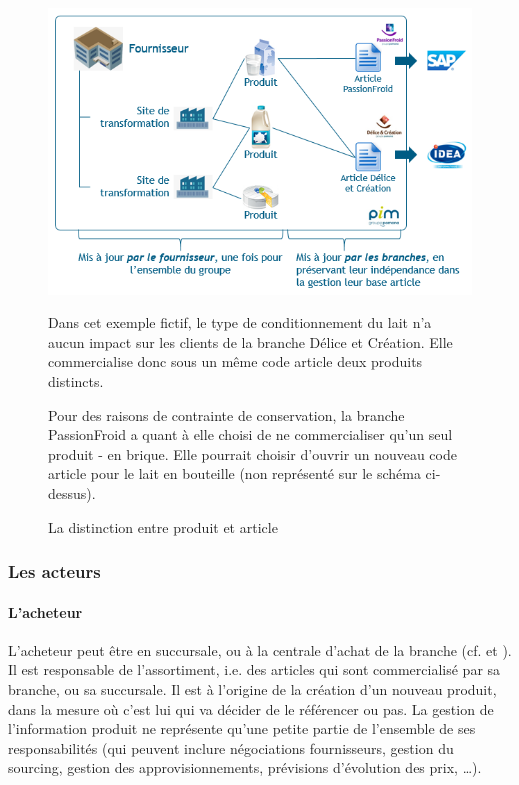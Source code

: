             \begin{figure}[htbp]
                \begin{center}
                \includegraphics[width=0.8\linewidth]{img/Produit article.png}
                \end{center}
                Dans cet exemple fictif, le type de conditionnement du lait n'a aucun impact sur les clients de la branche Délice et Création. Elle commercialise donc sous un même code article deux produits distincts.

                Pour des raisons de contrainte de conservation, la branche PassionFroid a quant à elle choisi de ne commercialiser qu'un seul produit - en brique. Elle pourrait choisir d'ouvrir un nouveau code article pour le lait en bouteille (non représenté sur le schéma ci-dessus).
                \caption{La distinction entre produit et article}
                \label{fig:produit_article}
            \end{figure}          

            \subsubsection{Les acteurs}

                \paragraph{L'acheteur}
                L'acheteur peut être en succursale, ou à la centrale d'achat de la branche (cf.  et ).
                Il est responsable de l'assortiment, i.e. des articles qui sont commercialisé par sa branche, ou sa succursale.
                Il est à l'origine de la création d'un nouveau produit, dans la mesure où c'est lui qui va décider de le référencer ou pas.
                La gestion de l'information produit ne représente qu'une petite partie de l'ensemble de ses responsabilités (qui peuvent inclure négociations fournisseurs, gestion du sourcing, gestion des approvisionnements, prévisions d'évolution des prix, \dots).

